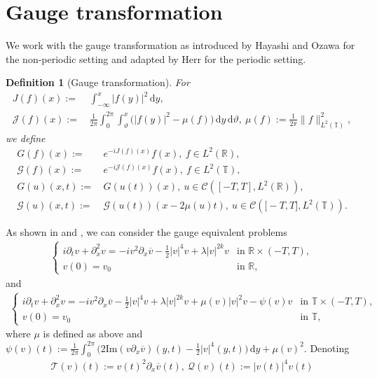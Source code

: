 \documentclass[reqno]{amsart}
\theoremstyle{Definitionl}
\newtheorem{defi}{Definition}[section]
\theoremstyle{Definitionk}
\theoremstyle{definition}
\theoremstyle{Satzk}
\theoremstyle{Satzl}
\theoremstyle{Bemerkung}
\begin{document}
\section{Gauge transformation}\label{Gauge}
We work with the gauge transformation as introduced by Hayashi and Ozawa \cite{HaOz2} for the non-periodic setting and adapted by Herr \cite{Herr} for the periodic setting.
\begin{defi}[Gauge transformation]
For 
\begin{align*}
J(f)(x):=&\,\int_{-\infty}^x|f(y)|^2\,\mathrm dy,\\
\mathcal J(f)(x):=&\,\frac{1}{2\pi}\int_0^{2\pi}\int_\vartheta^{x}\big(|f(y)|^2-\mu(f)\big)\,\mathrm dy\,\mathrm d\vartheta,\ 
\mu(f):=\tfrac1{2\pi}\|f\|_{L^2(\mathbb T)}^2,
\end{align*}
we define
\begin{align*}
G(f)(x):=&\, e^{-i J(f)(x)}f(x),\ f\in L^2(\mathbb R),\\
\mathcal G(f)(x):=&\, e^{-i\mathcal J(f)(x)}f(x),\ f\in L^2(\mathbb T),\\
G(u)(x,t):=&\, G(u(t))(x),\ u\in\mathcal C([-T,T],L^2(\mathbb R)),\\
\mathcal G(u)(x,t):=&\, \mathcal G(u(t))(x-2\mu(u)t),\ u\in\mathcal C(\mathbb [-T,T],L^2(\mathbb T)).
\end{align*}
\end{defi}
As shown in \cite{HaOz} and \cite{Herr}, we can consider the gauge equivalent problems
\begin{align*}
\begin{cases}
i\partial_tv+\partial_x^2v= -iv^2\partial_x\overline v-\frac12|v|^4v+\lambda |v|^{2k}v &\text{in }\mathbb R \times(-T,T),\\
v(0)= v_0 &\text{in }\mathbb R,
\end{cases}
\end{align*}
and
\begin{align*}
\begin{cases}
i\partial_tv+\partial_x^2v= -iv^2\partial_x\overline v-\frac12|v|^4v+\lambda|v|^{2k}v+\mu(v)|v|^2v-\psi(v)v &\text{in }\mathbb T \times(-T,T),\\
v(0)= v_0 &\text{in }\mathbb T,
\end{cases}
\end{align*}
where $\mu$ is defined as above and $\psi(v)(t):= \tfrac{1}{2\pi}\int_0^{2\pi}\big(2\mathrm{Im}(v\partial_x\overline v)(y,t)-\tfrac12|v|^4(y,t)\big)\,\mathrm dy+\mu(v)^2$. Denoting
\begin{align*}
\mathcal T(v)(t):= v(t)^2\partial_x\overline v(t),\ 
\mathcal Q(v)(t):= |v(t)|^4v(t)
\end{align*}
\end{document}
